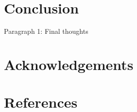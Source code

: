 \documentclass{juliacon}
\begin{document}
\section{Conclusion}

Paragraph 1: Final thoughts

\section{Acknowledgements}

\section{References}


\end{document}

